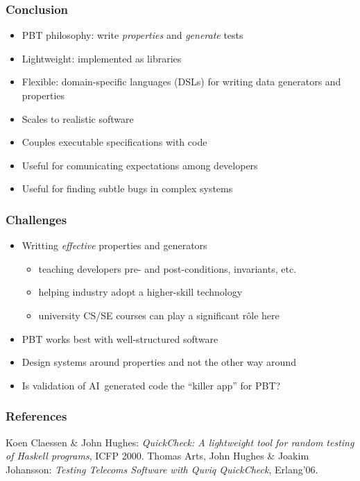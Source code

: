 \documentclass{beamer}
\begin{document}
\begin{frame}[allowframebreaks]
  \frametitle{Conclusion}

\begin{itemize}
\item PBT philosophy: write \emph{properties} and \emph{generate} tests
\item Lightweight: implemented as libraries
\item Flexible: domain-specific languages (DSLs) for writing
    data generators and properties
 \item Scales to realistic software
    
\item Couples executable specifications with code
\item Useful for comunicating expectations among developers
\item Useful for finding subtle bugs in complex systems 
\end{itemize}
\end{frame}

\begin{frame}
  \frametitle{Challenges}
\begin{itemize}
\item Writting \emph{effective} properties and generators
  \begin{itemize}
  \item teaching developers pre- and post-conditions, invariants, etc.
  \item helping industry adopt a higher-skill technology 
  \item university CS/SE courses can play a significant rôle here
  \end{itemize}
\item PBT works best with well-structured software
\item Design systems around properties and not the other way around
\item Is validation of AI~generated code the ``killer app''
  for PBT? 
\end{itemize}
\end{frame}

\begin{frame}
  \frametitle{References}

  \begin{thebibliography}{9}
   Koen Claessen \& John Hughes: \newblock
    \emph{QuickCheck: A lightweight tool for random testing
      of Haskell programs}, ICFP 2000.
   Thomas Arts, John Hughes \& Joakim Johansson: \newblock
    \emph{Testing Telecoms Software with Quviq QuickCheck}, Erlang'06.
\end{thebibliography}
\end{frame}
\end{document}
